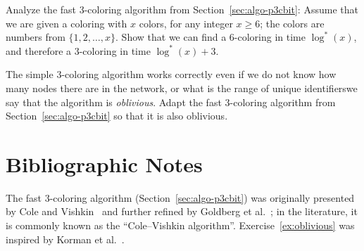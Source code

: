 \begin{exs}\label{ex:logstar-tight}
    Analyze the fast 3-coloring algorithm from Section~\ref{sec:algo-p3cbit}:
    Assume that we are given a coloring with $x$ colors, for any integer $x \ge 6$; the colors are numbers from $\{1,2,\dotsc,x\}$. Show that we can find a $6$-coloring in time $\log^*(x)$, and therefore a $3$-coloring in time $\log^*(x) + 3$.
\end{exs}

\begin{exs}\label{ex:oblivious}
    The simple 3-coloring algorithm works correctly even if we do not know how many nodes there are in the network, or what is the range of unique identifiers\mydash we say that the algorithm is \emph{oblivious}. Adapt the fast 3-coloring algorithm from Section~\ref{sec:algo-p3cbit} so that it is also oblivious.
\end{exs}


\section{Bibliographic Notes}

The fast 3-coloring algorithm (Section~\ref{sec:algo-p3cbit}) was originally presented by Cole and Vishkin~\cite{cole86deterministic} and further refined by Goldberg et al.~\cite{goldberg88parallel}; in the literature, it is commonly known as the ``Cole--Vishkin algorithm''. Exercise~\ref{ex:oblivious} was inspired by Korman et al.~\cite{korman11removing}.
